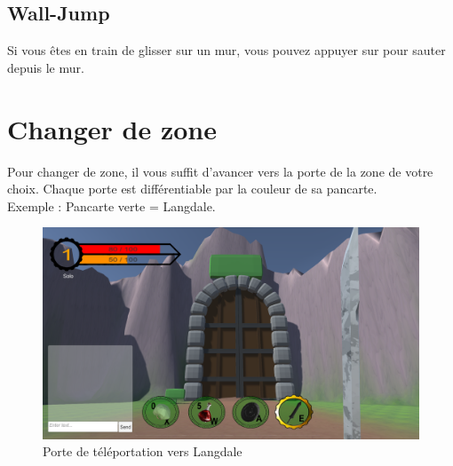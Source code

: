 \documentclass[a4paper]{article}
\begin{document}
	\subsection{Wall-Jump}
	\noindent Si vous êtes en train de glisser sur un mur, vous pouvez appuyer sur  pour sauter depuis le mur.
	
	\section{Changer de zone}
	Pour changer de zone, il vous suffit d'avancer vers la porte de la zone de votre choix. Chaque porte est différentiable par la couleur de sa pancarte.
	\\ 
	Exemple : Pancarte verte = Langdale.
	\begin{figure}[!h]
		\centering
		\includegraphics[scale=0.3]{images/porte_langdale.png}
		\caption{Porte de téléportation vers Langdale}
	\end{figure}
\end{document}
